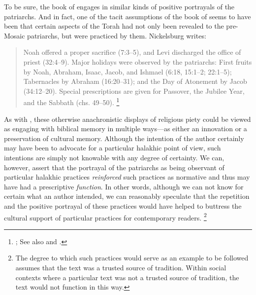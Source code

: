 To be sure, the book of \jub engages in similar kinds of positive portrayals of the patriarchs. And in fact, one of the tacit assumptions of the book of \jub seems to have been that certain aspects of the Torah had not only been revealed to the pre-Mosaic patriarchs, but were practiced by them. Nickelsburg writes:
    \begin{quote}
        Noah offered a proper sacrifice (7:3--5), and Levi discharged the office of priest (32:4--9). Major holidays were observed by the patriarchs: First fruits by Noah, Abraham, Isaac, Jacob, and Ishmael (6:18, 15:1--2; 22:1--5); Tabernacles by Abraham (16:20--31); and the Day of Atonement by Jacob (34:12--20). Special prescriptions are given for Passover, the Jubilee Year, and the Sabbath (chs. 49--50).%
        \footnote{%
            \Cite[69]{nickelsburg2005}; See also 
            \cite[70]{crawford2008} and 
            \cite{finkelstein_htr1923}.}
    \end{quote}
\noindent
As with \ga, these otherwise anachronistic displays of religious piety could be viewed as engaging with biblical memory in multiple ways---as either an innovation or a preservation of cultural memory. Although the intention of the author certainly may have been to advocate for a particular halakhic point of view, such intentions are simply not knowable with any degree of certainty. We can, however, assert that the portrayal of the patriarchs as being observant of particular halakhic practices \emph{reinforced} such practices as normative and thus may have had a prescriptive \emph{function}. In other words, although we can not know for certain what an author intended, we can reasonably speculate that the repetition and the positive portrayal of these practices would have helped to buttress the cultural support of particular practices for contemporary readers.%
    \footnote{%
        The degree to which such practices would serve as an example to be followed assumes that the text was a trusted source of tradition. Within social contexts where a particular text was not a trusted source of tradition, the text would not function in this way.}

